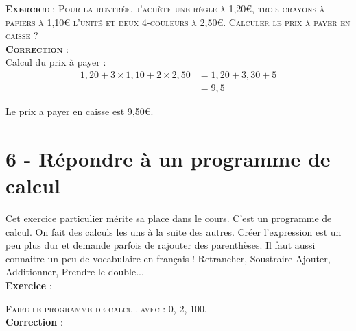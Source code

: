 \documentclass[11pt]{article}
\begin{document}
\textsc{\textbf{Exercice} : Pour la rentrée, j'achète une règle à 1,20€, trois crayons à papiers à 1,10€ l'unité et deux 4-couleurs à 2,50€.} \newline
\textsc{Calculer le prix à payer en caisse ?}\\

\textsc{\textbf{Correction} :}\\

Calcul du prix à payer :
\begin{align*}
1,20 + 3 \times 1,10 + 2 \times 2,50 &= 1,20 + 3,30 + 5 \\
                                     &= 9,5
\end{align*}

Le prix a payer en caisse est 9,50€.

\newpage

\section*{6 - Répondre à un programme de calcul}

Cet exercice particulier mérite sa place dans le cours. C'est un programme de calcul. On fait des calculs les uns à la suite des autres. Créer l'expression est un peu plus dur et demande parfois de rajouter des parenthèses. Il faut aussi connaitre un peu de vocabulaire en français ! Retrancher, Soustraire Ajouter, Additionner, Prendre le double... \\

\textbf{Exercice} : 

\begin{center}\end{center}

\textsc{Faire le programme de calcul avec : 0, 2, 100.} \\

\textbf{Correction} :
\end{document}
